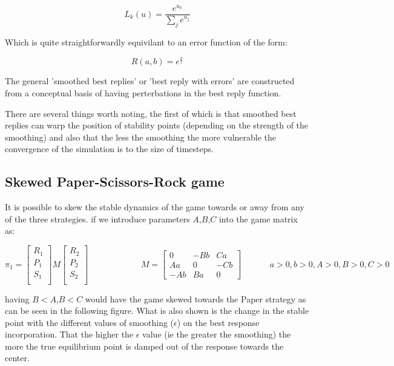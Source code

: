 \documentclass[journal,article,accept,oneauthors,pdftex,10pt,a4paper]{mdpi}
\begin{document}
$$ L_k(u) = \frac{e^{u_k}}{\sum_je^{u_j}} $$

Which is quite straightforwardly equivilant to an error function of the form:

$$R(a,b) = e^{\frac{a}{\epsilon}}$$

The general 'smoothed best replies'\cite{psr1} or 'best reply with errors'\cite{errors1} are constructed from a conceptual basis of having perterbations in the best reply function.

There are several things worth noting, the first of which is that smoothed best replies can warp the position of stability points (depending on the strength of the smoothing) and also that the less the smoothing the more vulnerable the convergence of the simulation is to the size of timesteps.

\subsection{Skewed Paper-Scissors-Rock game}

It is possible to skew the stable dynamics of the game towards or away from any of the three strategies.
if we introduce parameters $A$,$B$,$C$ into the game matrix as:

$$ \pi_1=\begin{bmatrix}
    R_1 \\
    P_1 \\
    S_1 \\
\end{bmatrix}
M
\begin{bmatrix}
    R_2 \\
    P_2 \\
    S_2 \\
\end{bmatrix} ~~~~~~~~~~~~~~~~~~~~~~~~~~~~M= \begin{bmatrix}
    0&-Bb&Ca\\
    Aa&0&-Cb\\
    -Ab&Ba&0
\end{bmatrix}~~~~~~~~~~~~~~~a>0,b>0,A>0,B>0,C>0 $$

having $B<A$,$B<C$ would have the game skewed towards the Paper strategy as can be seen in the following figure.
What is also shown is the change in the stable point with the different values of smoothing ($\epsilon$) on the best response incorporation.
That the higher the $\epsilon$ value (ie the greater the smoothing) the more the true equilibrium point is damped out of the response towards the center.
\end{document}
